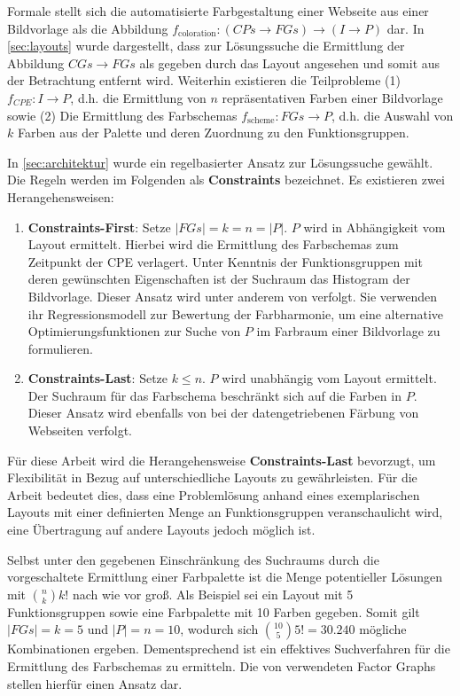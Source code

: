 Formale stellt sich die automatisierte Farbgestaltung einer Webseite aus einer Bildvorlage als die Abbildung $f_\text{coloration}: (CPs \to FGs) \to (I \to P)$ dar. In \autoref{sec:layouts} wurde dargestellt, dass zur Lösungssuche die Ermittlung der Abbildung $CGs \to FGs$ als gegeben durch das Layout angesehen und somit aus der Betrachtung entfernt wird. Weiterhin existieren die Teilprobleme (1) $f_{CPE}: I \to P$, d.h. die Ermittlung von $n$ repräsentativen Farben einer Bildvorlage sowie (2) Die Ermittlung des Farbschemas $f_\text{scheme}: FGs \to P$, d.h. die Auswahl von $k$ Farben aus der Palette und deren Zuordnung zu den Funktionsgruppen.

In \autoref{sec:architektur} wurde ein regelbasierter Ansatz zur Lösungssuche gewählt. Die Regeln werden im Folgenden als \textbf{Constraints} bezeichnet. Es existieren zwei Herangehensweisen:
\begin{enumerate}
    \item \textbf{Constraints-First}: Setze $|FGs| = k = n = |P|$. $P$ wird in Abhängigkeit vom Layout ermittelt. Hierbei wird die Ermittlung des Farbschemas zum Zeitpunkt der CPE verlagert. Unter Kenntnis der Funktionsgruppen mit deren gewünschten Eigenschaften ist der Suchraum das Histogram der Bildvorlage. Dieser Ansatz wird unter anderem von \citet{colorcomp} verfolgt. Sie verwenden ihr Regressionsmodell zur Bewertung der Farbharmonie, um eine alternative Optimierungsfunktionen zur Suche von $P$ im Farbraum einer Bildvorlage zu formulieren.
    \item \textbf{Constraints-Last}: Setze $k \leq n$. $P$ wird unabhängig vom Layout ermittelt. Der Suchraum für das Farbschema beschränkt sich auf die Farben in $P$. Dieser Ansatz wird ebenfalls von \citep{webpage} bei der datengetriebenen Färbung von Webseiten verfolgt.
\end{enumerate}

Für diese Arbeit wird die Herangehensweise \textbf{Constraints-Last} bevorzugt, um Flexibilität in Bezug auf unterschiedliche Layouts zu gewährleisten. Für die Arbeit bedeutet dies, dass eine Problemlösung anhand eines exemplarischen Layouts mit einer definierten Menge an Funktionsgruppen veranschaulicht wird, eine Übertragung auf andere Layouts jedoch möglich ist.

Selbst unter den gegebenen Einschränkung des Suchraums durch die vorgeschaltete Ermittlung einer Farbpalette ist die Menge potentieller Lösungen mit $\binom{n}{k} k!$ nach wie vor groß. Als Beispiel sei ein Layout mit 5 Funktionsgruppen sowie eine Farbpalette mit 10 Farben gegeben. Somit gilt $|FGs| = k = 5$ und $|P| = n = 10$, wodurch sich $\binom{10}{5} 5! = 30.240$ mögliche Kombinationen ergeben. Dementsprechend ist ein effektives Suchverfahren für die Ermittlung des Farbschemas zu ermitteln. Die von \citet{patterns} verwendeten Factor Graphs stellen hierfür einen Ansatz dar.

